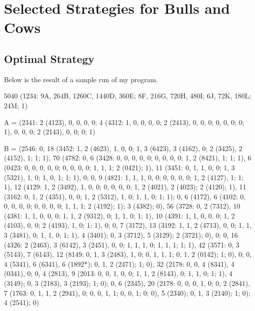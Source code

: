 \section{Selected Strategies for Bulls and Cows}

\subsection{Optimal Strategy}

Below is the result of a sample run of my program.

{ \scriptsize
5040 (1234: 9A, 264B, 1260C, 1440D, 360E; 8F, 216G, 720H, 480I; 6J, 72K, 180L; 24M; 1)

A = (2341: 2 (4123), 0, 0, 0, 0; 4 (4312: 1, 0, 0, 0, 0; 2 (2413), 0, 0, 0; 0, 0, 0; 0; 1), 0, 0, 0; 2 (2143), 0, 0; 0; 1)

B = (2546: 0, 18 (3452: 1, 2 (4623), 1, 0, 0; 1, 3 (6423), 3 (4162), 0; 2 (3425), 2 (4152), 1; 1; 1), 70 (4782: 0, 6 (3428: 0, 0, 0, 0, 0; 0, 0, 0, 0; 1, 2 (8421), 1; 1; 1), 6 (0423: 0, 0, 0, 0, 0; 0, 0, 0, 0; 1, 1, 1; 2 (0421); 1), 11 (3451: 0, 1, 1, 0, 0; 1, 3 (5321), 1, 0; 1, 0, 1; 1; 1), 0; 0, 9 (4821: 1, 1, 1, 0, 0; 0, 0, 0, 0; 1, 2 (4127), 1; 1; 1), 12 (4129: 1, 2 (3492), 1, 0, 0; 0, 0, 0, 0; 1, 2 (4021), 2 (4023); 2 (4120); 1), 11 (3162: 0, 1, 2 (4351), 0, 0; 1, 2 (5312), 1, 0; 1, 1, 0; 1; 1); 0, 6 (4172), 6 (4102: 0, 0, 0, 0, 0; 0, 0, 0, 0; 1, 1, 1; 2 (4192); 1); 3 (4382); 0), 56 (3728: 0, 2 (7312), 10 (4381: 1, 1, 0, 0, 0; 1, 1, 2 (9312), 0; 1, 1, 0; 1; 1), 10 (4391: 1, 1, 0, 0, 0; 1, 2 (4103), 0, 0; 2 (4193), 1, 0; 1; 1), 0; 0, 7 (3172), 13 (3192: 1, 1, 2 (4713), 0, 0; 1, 1, 3 (3481), 0; 1, 1, 0; 1; 1), 4 (3401); 0, 3 (3712), 5 (3129); 2 (3721); 0), 0; 0, 16 (4326: 2 (2463), 3 (6142), 3 (2451), 0, 0; 1, 1, 1, 0; 1, 1, 1; 1; 1), 42 (3571: 0, 3 (5143), 7 (6143), 12 (8149: 0, 1, 3 (2483), 1, 0; 0, 1, 1, 1; 0, 1, 2 (0142); 1; 0), 0; 0, 4 (5341), 6 (6341), 6 (1892*); 0, 1, 2 (2471); 1; 0), 32 (2178: 0, 0, 4 (8341), 4 (0341), 0; 0, 4 (2813), 9 (2013: 0, 0, 1, 0, 0; 1, 1, 2 (8143), 0; 1, 1, 0; 1; 1), 4 (3149); 0, 3 (2183), 3 (2193); 1; 0); 0, 6 (2345), 20 (2178: 0, 0, 0, 1, 0; 0, 2 (2841), 7 (1763: 0, 1, 1, 2 (2941), 0; 0, 0, 1, 1; 0, 0, 1; 0; 0), 5 (2340); 0, 1, 3 (2140); 1; 0); 4 (2541); 0)

}
